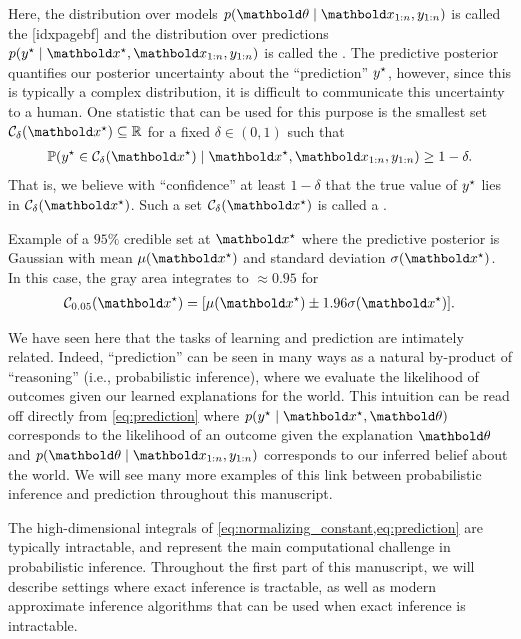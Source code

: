 Here, the distribution over models $p(\vtheta \mid \vx_{1:n}, y_{1:n})$ is called the [idxpagebf] and the distribution over predictions $p(\ys \mid \vxs, \vx_{1:n}, y_{1:n})$ is called the .
The predictive posterior quantifies our posterior uncertainty about the ``prediction'' $y^\star$, however, since this is typically a complex distribution, it is difficult to communicate this uncertainty to a human.
One statistic that can be used for this purpose is the smallest set $\spC_\delta(\vxs) \subseteq \R$ for a fixed $\delta \in (0,1)$ such that \begin{align}
  \Pr{\ys \in \spC_\delta(\vxs) \mid \vxs, \vx_{1:n}, y_{1:n}} \geq 1 - \delta. \label{eq:credible_interval}
\end{align}
That is, we believe with ``confidence'' at least $1 - \delta$ that the true value of $y^\star$ lies in $\spC_\delta(\vxs)$.
Such a set $\spC_\delta(\vxs)$ is called a .

\begin{marginfigure}
  \caption{Example of a $95\%$ credible set at $\vxs$ where the predictive posterior is Gaussian with mean $\mu(\vxs)$ and standard deviation $\sigma(\vxs)$. In this case, the gray area integrates to $\approx 0.95$ for \begin{align*}
    \spC_{0.05}(\vxs) = [\mu(\vxs) \pm 1.96 \sigma(\vxs)].
  \end{align*}}
  \label{fig:credible_intervals}
\end{marginfigure}

We have seen here that the tasks of learning and prediction are intimately related.
Indeed, ``prediction'' can be seen in many ways as a natural by-product of ``reasoning'' (i.e., probabilistic inference), where we evaluate the likelihood of outcomes given our learned explanations for the world.
This intuition can be read off directly from \cref{eq:prediction} where $p(\ys \mid \vxs, \vtheta)$ corresponds to the likelihood of an outcome given the explanation $\vtheta$ and $p(\vtheta \mid \vx_{1:n}, y_{1:n})$ corresponds to our inferred belief about the world.
We will see many more examples of this link between probabilistic inference and prediction throughout this manuscript.

The high-dimensional integrals of \cref{eq:normalizing_constant,eq:prediction} are typically intractable, and represent the main computational challenge in probabilistic inference.
Throughout the first part of this manuscript, we will describe settings where exact inference is tractable, as well as modern approximate inference algorithms that can be used when exact inference is intractable.

